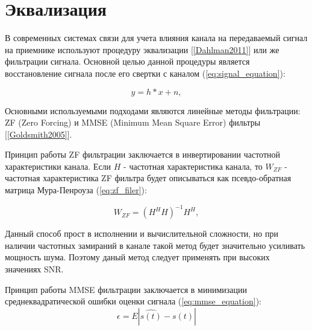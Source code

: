 \section{Эквализация}

В современных системах связи для учета влияния канала на передаваемый сигнал на приемнике
используют процедуру эквализации [\ref{Dahlman2011}] или же фильтрации сигнала.
Основной целью данной процедуры является восстановление сигнала после его свертки с каналом (\ref{eq:signal_equation}):

\begin{equation}
    y = h * x + n,
    \label{eq:signal_equation}
\end{equation}

Основными используемыми подходами являются линейные методы фильтрации: ZF (Zero Forcing) и MMSE (Minimum Mean Square Error) фильтры [\ref{Goldsmith2005}].

Принцип работы ZF фильтрации заключается в инвертировании частотной характеристики канала. Если $H$ - частотная
характеристика канала, то $W_{ZF}$ - частотная характеристика ZF фильтра будет описываться как псевдо-обратная матрица
Мура-Пенроуза (\ref{eq:zf_filer}):

\begin{equation}
    W_{ZF} = (H^H H)^{-1} H^H,
    \label{eq:zf_filer}
\end{equation}

Данный способ прост в исполнении и вычислительной сложности, но при наличии частотных замираний в канале
такой метод будет значительно усиливать мощность шума. Поэтому даный метод следует применять при высоких значениях SNR.

Принцип работы MMSE фильтрации заключается в минимизации среднеквадратической ошибки оценки сигнала (\ref{eq:mmse_equation}):
\begin{equation}
    \epsilon = E{|\hat{s(t)} - s(t)|}
    \label{eq:mmse_equation}
\end{equation}

